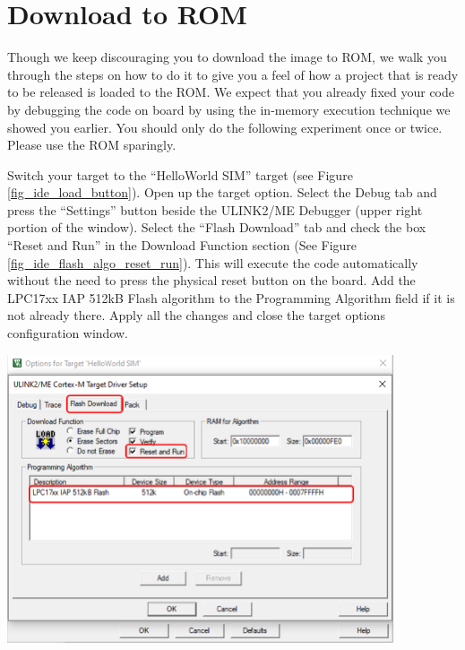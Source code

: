 \section{Download to ROM}
Though we keep discouraging you to download the image to ROM, we walk you through the steps on how to do it to give you a feel of how a project that is ready to be released is loaded to the ROM. We expect that you already fixed your code by debugging the code on board by using the in-memory execution technique we showed you earlier. You should only do the following experiment once or twice. Please use the ROM sparingly.

Switch your target to the ``HelloWorld SIM'' target (see Figure \ref{fig_ide_load_button}). Open up the target option. Select the Debug tab and press the ``Settings'' button beside the ULINK2/ME Debugger (upper right portion of the window). Select the ``Flash Download'' tab and check the box ``Reset and Run'' in the Download Function section (See Figure \ref{fig_ide_flash_algo_reset_run}). This will execute the code automatically without the need to press the physical reset button on the board. Add the LPC17xx IAP 512kB Flash algorithm to the Programming Algorithm field if it is not already there. Apply all the changes and close the target options configuration window. \par

  \begin{minipage}{\linewidth}
    \centering
    \includegraphics[width=4.5in]{figure/uv5/IDE_flash_algo_reset_run}
    \label{fig_ide_flash_algo_reset_run}
  \end{minipage} \\

